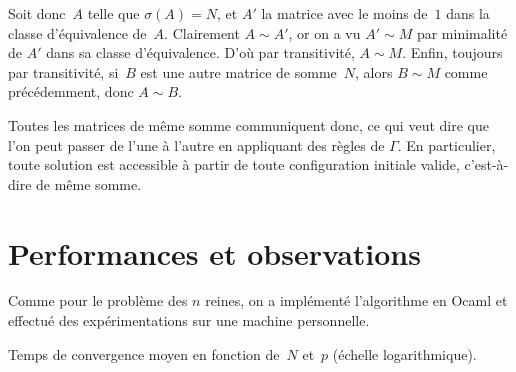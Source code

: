 Soit donc~$A$ telle que $\sigma(A)=N$, et $A'$ la matrice avec le moins de~$1$ dans la classe d'équi\-valence de~$A$. Clairement $A \sim A'$, or on a vu $A'\sim M$ par minimalité de $A'$ dans sa classe d'équivalence. D'où par transitivité, $A \sim M$. Enfin, toujours par transitivité, si~$B$ est une autre matrice de somme~$N$, alors $B \sim M$ comme précédemment, donc $A \sim B$.

Toutes les matrices de même somme communiquent donc, ce qui veut dire que l'on peut passer de l'une à l'autre en appliquant des règles de $\Gamma$. En particulier, toute solution est accessible à partir de toute configuration initiale valide, c'est-à-dire de même somme. 



\section{Performances et observations}

Comme pour le problème des $n$ reines, on a implémenté l'algorithme en Ocaml et effectué des expérimentations sur une machine personnelle.

\begin{floatingfigure}[r]{.6\textwidth}
  \centering
  \vspace{-2em}
  \caption{Temps de convergence moyen en fonction de~$N$ et~$p$ (échelle logarithmique).}
  \label{fig:p_ag}
\end{floatingfigure}  

